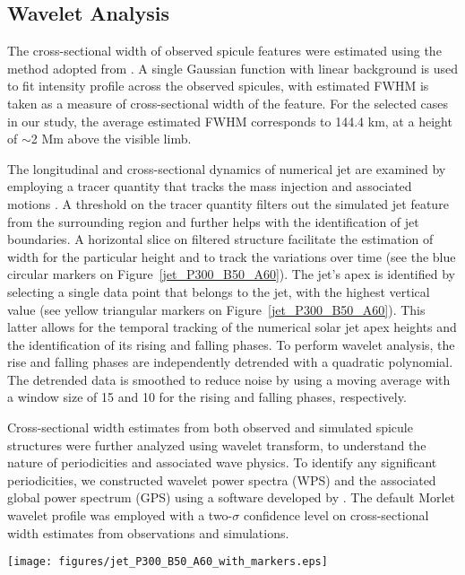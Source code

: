 \subsection{Wavelet Analysis} 
The cross-sectional width of observed spicule features were estimated using the method adopted from \citet{Sharma2018}. A single Gaussian function with linear background is used to fit intensity profile across the observed spicules, with estimated FWHM is taken as a measure of cross-sectional width of the feature. For the selected cases in our study, the average estimated FWHM corresponds to 144.4 km, at a height of $\sim$2 Mm above the visible limb.


The longitudinal and cross-sectional dynamics of numerical jet are examined by employing a tracer quantity that tracks the mass injection and associated motions \citep{Porth_2014}. A threshold on the tracer quantity filters out the simulated jet feature from the surrounding region and further helps with the identification of jet boundaries. A horizontal slice on filtered structure facilitate the estimation of width for the particular height and to track the variations over time (see the blue circular markers on  Figure~\ref{jet_P300_B50_A60}). The jet's apex is identified by selecting a single data point that belongs to the jet, with the highest vertical value (see yellow triangular markers on  Figure~\ref{jet_P300_B50_A60}). This latter allows for the temporal tracking of the numerical solar jet apex heights and the identification of its rising and falling phases. To perform wavelet analysis, the rise and falling phases are independently detrended with a quadratic polynomial. The detrended data is smoothed to reduce noise by using a moving average with a window size of 15 and 10 for the rising and falling phases, respectively.       

Cross-sectional width estimates from both observed and simulated spicule structures were further analyzed using wavelet transform, to understand the nature of periodicities and associated wave physics. To identify any significant periodicities, we constructed wavelet power spectra (WPS) and the associated global power spectrum (GPS) using a software developed by \cite{Torrence1998}. The default Morlet wavelet profile was employed with a two-$\sigma$ confidence level on cross-sectional width estimates from observations and simulations. 

\begin{figure*}
\texttt{[image: figures/jet\_P300\_B50\_A60\_with\_markers.eps]}
\caption{Panels showing the temporal evolution of the simulated spicule density structure at four time-steps with apex marked by a yellow triangle. From $121.08-243.88 ~\rm{s}$ ($366.68-489.48~\rm{s}$)  the rising (falling)-phase Location of tracers edges are also shown as blue dots, which are used to estimate the variations in cross-sectional width during rise- and fall-phases of jet structure.}
\label{jet_P300_B50_A60} 
\end{figure*}

